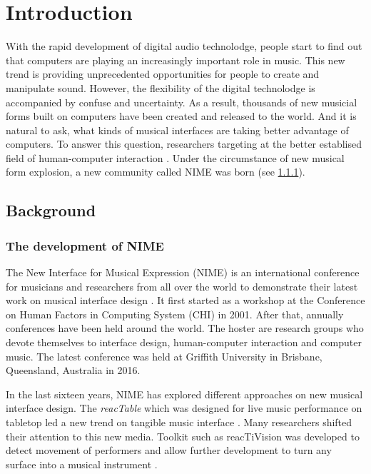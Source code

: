 \pagestyle{fancy}
\rhead{\thepage}
\chapter{Introduction}

With the rapid development of digital audio technolodge, people start to find out that computers are playing an increasingly important role in music. This new trend is providing unprecedented opportunities for people to create and manipulate sound. However, the flexibility of the digital technolodge is accompanied by confuse and uncertainty. As a result, thousands of new musicial forms built on computers have been created and released to the world. And it is natural to ask, what kinds of musical interfaces are taking better advantage of computers. To answer this question, researchers targeting at the better establised field of human-computer interaction \citep{Reference16}. Under the circumstance of new musical form explosion, a new community called NIME was born (see \ref{subsec: nime}).

\section{Background}
\label{sec: backgound}

\subsection{The development of NIME}
\label{subsec: nime}
The New Interface for Musical Expression (NIME) is an international conference for musicians and researchers from all over the world to demonstrate their latest work on musical interface design \citep{Reference15}. It first started as a workshop at the Conference on Human Factors in Computing System (CHI) in 2001. After that, annually conferences have been held around the world. The hoster are research groups who devote themselves to interface design, human-computer interaction and computer music. The latest conference was held at Griffith University in Brisbane, Queensland, Australia in 2016.

In the last sixteen years, NIME has explored different approaches on new musical interface design. The \textit{reacTable} which was designed for live music performance on tabletop led a new trend on tangible music interface \citep{Reference17}. Many researchers shifted their attention to this new media. Toolkit such as reacTiVision was developed to detect movement of performers and allow further development to turn any surface into a musical instrument \citep{Reference18}.

